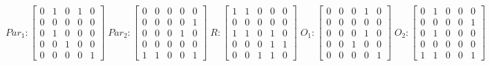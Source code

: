      $$
        Par_{1} : \begin{bmatrix}
            0 & 1 & 0 & 1 & 0 \\
            0 & 0 & 0 & 0 & 0 \\
            0 & 1 & 0 & 0 & 0 \\
			0 & 0 & 1 & 0 & 0 \\
            0 & 0 & 0 & 0 & 1 
        \end{bmatrix}
        \;
        Par_{2} : \begin{bmatrix}
            0 & 0 & 0 & 0 & 0 \\
            0 & 0 & 0 & 0 & 1 \\
            0 & 0 & 0 & 1 & 0 \\
            0 & 0 & 0 & 0 & 0 \\
            1 & 1 & 0 & 0 & 1
        \end{bmatrix}
        \;
        R : \begin{bmatrix}
            1 & 1 & 0 & 0 & 0 \\
            0 & 0 & 0 & 0 & 0 \\
            1 & 1 & 0 & 1 & 0 \\
            0 & 0 & 0 & 1 & 1 \\
            0 & 0 & 1 & 1 & 0
        \end{bmatrix}
        \;
        O_{1} : \begin{bmatrix}
            0 & 0 & 0 & 1 & 0 \\
            0 & 0 & 0 & 0 & 0 \\
            0 & 0 & 0 & 1 & 0 \\
            0 & 0 & 1 & 0 & 0 \\
            0 & 0 & 0 & 0 & 1
        \end{bmatrix}
        \;
        O_{2} : \begin{bmatrix}
            0 & 1 & 0 & 0 & 0 \\
            0 & 0 & 0 & 0 & 1 \\
            0 & 1 & 0 & 0 & 0 \\
            0 & 0 & 0 & 0 & 0 \\
            1 & 1 & 0 & 0 & 1
        \end{bmatrix}
    $$ 
